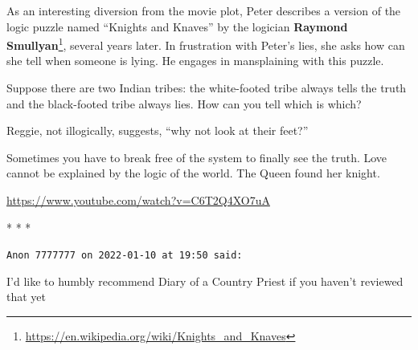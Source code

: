 As an interesting diversion from the movie plot, Peter describes a version of the logic puzzle named ``Knights and Knaves'' by the logician \textbf{Raymond Smullyan}\footnote{\url{https://en.wikipedia.org/wiki/Knights\_and\_Knaves}}, several years later. In frustration with Peter's lies, she asks how can she tell when someone is lying. He engages in mansplaining with this puzzle.

Suppose there are two Indian tribes: the white-footed tribe always tells the truth and the black-footed tribe always lies. How can you tell which is which?

Reggie, not illogically, suggests, ``why not look at their feet?''

Sometimes you have to break free of the system to finally see the truth. Love cannot be explained by the logic of the world. The Queen found her knight.

\url{https://www.youtube.com/watch?v=C6T2Q4XO7uA}


\begin{center}* * *\end{center}

\begin{footnotesize}
\begin{sffamily}
\texttt{Anon 7777777 on 2022-01-10 at 19:50 said:}

I'd like to humbly recommend Diary of a Country Priest if you haven't reviewed that yet

\end{sffamily}
\end{footnotesize}

